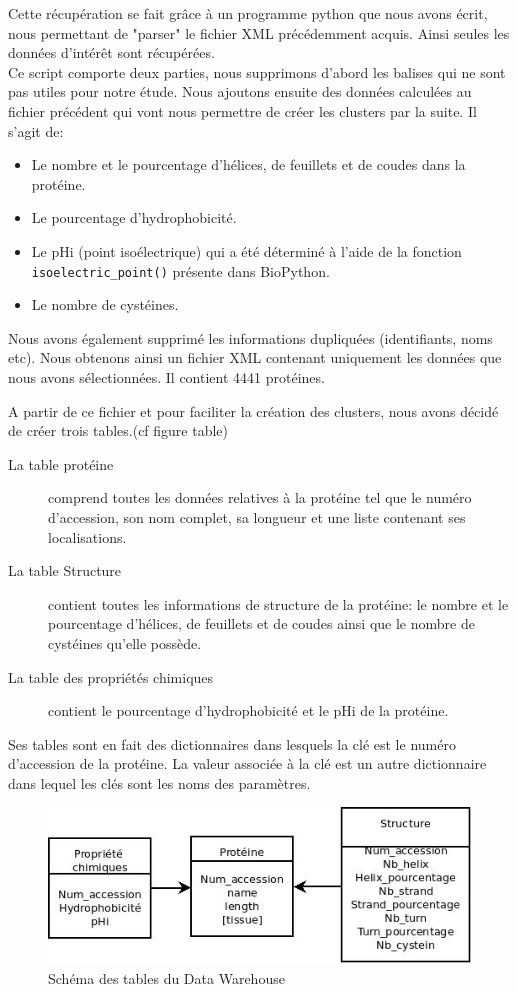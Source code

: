 Cette récupération se fait grâce à un programme python que nous avons écrit, nous permettant de "parser" le fichier XML précédemment acquis. Ainsi seules les données d'intérêt sont récupérées.\\

Ce script comporte deux parties, nous supprimons d'abord les balises qui ne sont pas utiles pour notre étude.
Nous ajoutons ensuite des données calculées au fichier précédent qui vont nous permettre de créer les clusters par la suite. Il s'agit de:
\begin{itemize}
\item Le nombre et le pourcentage d'hélices, de feuillets et de coudes dans la protéine.
\item Le pourcentage d'hydrophobicité.
\item Le pHi (point isoélectrique) qui a été déterminé à l'aide de la fonction\\ \texttt{isoelectric\_point()} présente dans BioPython.
\item Le nombre de cystéines.
\end{itemize}

Nous avons également supprimé les informations dupliquées (identifiants, noms etc).
Nous obtenons ainsi un fichier XML contenant uniquement les données que nous avons sélectionnées. Il contient 4441 protéines.

A partir de ce fichier et pour faciliter la création des clusters, nous avons décidé de créer trois tables.(cf figure table)
\begin{description}
\item[La table protéine] comprend toutes les données relatives à la protéine tel que le numéro d'accession, son nom complet, sa longueur et une liste contenant ses localisations.
\item[La table Structure] contient toutes les informations de structure de la protéine: le nombre et le pourcentage d'hélices, de feuillets et de coudes ainsi que le nombre de cystéines qu'elle possède.
\item[La table des propriétés chimiques] contient le pourcentage d'hydrophobicité et le pHi de la protéine.
\end{description}
Ses tables sont en fait des dictionnaires dans lesquels la clé est le numéro d'accession de la protéine. La valeur associée à la clé est un autre dictionnaire dans lequel les clés sont les noms des paramètres.

\begin{figure}
\begin{center}
\includegraphics[scale=0.5]{figtable.png}
\caption{Schéma des tables du Data Warehouse}
\end{center}
\end{figure}

